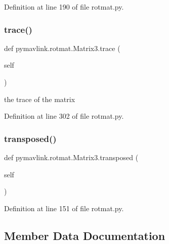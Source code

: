 Definition at line 190 of file rotmat.\+py.

\mbox{\label{classpymavlink_1_1rotmat_1_1Matrix3_ac10cb8963613b9febb43869cd22c58cf}} 
\subsubsection{\texorpdfstring{trace()}{trace()}}
{\footnotesize\ttfamily def pymavlink.\+rotmat.\+Matrix3.\+trace (\begin{DoxyParamCaption}\item[{}]{self }\end{DoxyParamCaption})}

\begin{DoxyVerb}the trace of the matrix\end{DoxyVerb}
 

Definition at line 302 of file rotmat.\+py.

\mbox{\label{classpymavlink_1_1rotmat_1_1Matrix3_a2e4b87e4a5f9ad6c71b44393094e247e}} 
\subsubsection{\texorpdfstring{transposed()}{transposed()}}
{\footnotesize\ttfamily def pymavlink.\+rotmat.\+Matrix3.\+transposed (\begin{DoxyParamCaption}\item[{}]{self }\end{DoxyParamCaption})}



Definition at line 151 of file rotmat.\+py.



\subsection{Member Data Documentation}
\mbox{\label{classpymavlink_1_1rotmat_1_1Matrix3_a6e59a3b14add2220f8a218e12d631464}} 

